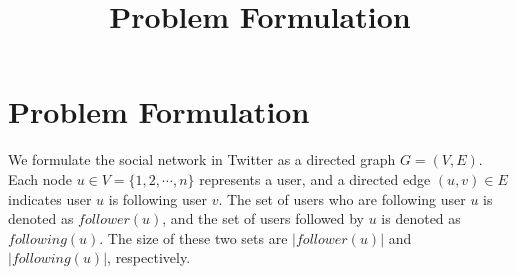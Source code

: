 \documentclass{article}
\begin{document}
\title{Problem Formulation}
\maketitle \else \fi

\newcommand{\following}{\ensuremath{following}}
\newcommand{\follower}{\ensuremath{follower}}

\section{Problem Formulation}\label{sec:problem}
We formulate the social network in Twitter as a directed graph $G = (V,E)$.
Each node $u \in V = \{1, 2, \cdots, n\}$ represents a user, and a directed edge $(u,v) \in E$ indicates
user $u$ is following user $v$. The set of users who are following user $u$ is denoted as $\follower(u)$, and the set of users followed by $u$ is denoted as $\following(u)$. The size of these two sets are $|\follower(u)|$ and $|\following(u)|$, respectively.



\end{document}
